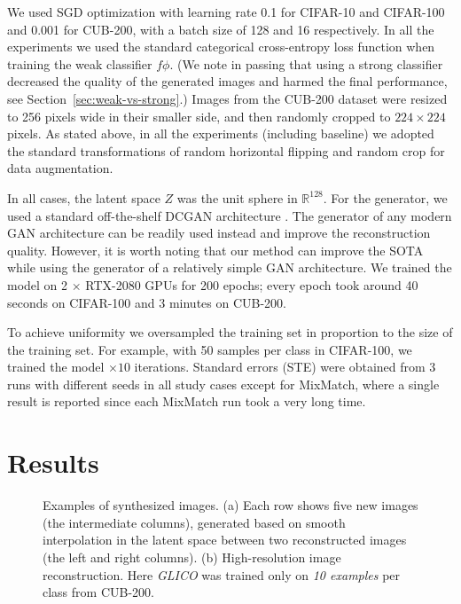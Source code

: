 \documentclass[a4paper,conference]{IEEEtran}
\begin{document}
We used SGD optimization with learning rate 0.1 for CIFAR-10 and CIFAR-100 and 0.001 for CUB-200, with a batch size of 128 and 16 respectively. In all the experiments we used the standard categorical cross-entropy loss function when training the weak classifier $f\phi$. (We note in passing that using a strong classifier decreased the quality of the generated images and harmed the final performance, see Section~\ref{sec:weak-vs-strong}.) Images from the CUB-200 dataset were resized to 256 pixels wide in their smaller side, and then randomly cropped to $224\times 224$ pixels. As stated above, in all the experiments (including baseline) we adopted the standard transformations of random horizontal flipping and random crop for data augmentation. 

In all cases, the latent space $Z$ was the unit sphere in ${\mathbb R}^{128}$. For the generator, we used a standard off-the-shelf DCGAN architecture \cite{radford2015unsupervised}. The generator of any modern GAN architecture can be readily used instead and improve the reconstruction quality. However, it is worth noting that our method can improve the SOTA while using the generator of a relatively simple GAN architecture. We trained the model on 2 $\times$ RTX-2080 GPUs for 200 epochs; every epoch took around 40 seconds on CIFAR-100 and 3 minutes on CUB-200.
		
To achieve uniformity we oversampled the training set in proportion to the size of the training set. For example, with 50 samples per class in CIFAR-100, we trained the model $\times 10$ iterations. Standard errors (STE) were obtained from 3 runs with different seeds in all study cases except for MixMatch, where a single result is reported since each MixMatch run took a very long time.
		

\section{Results}
\label{sec:results}


\begin{figure}[htbp]
\centering
	\qquad

		
				
	\caption{Examples of synthesized images. (a) Each row shows five new images (the intermediate columns), generated based on smooth interpolation in the latent space between two reconstructed images (the left and right columns).
		(b) High-resolution image reconstruction. Here \textit{GLICO} was trained only on \textit{10 examples} per class from CUB-200. \label{fig: cub_and_cifar_slerp}}


			
	\vskip -0.2in
\end{figure}
\end{document}
